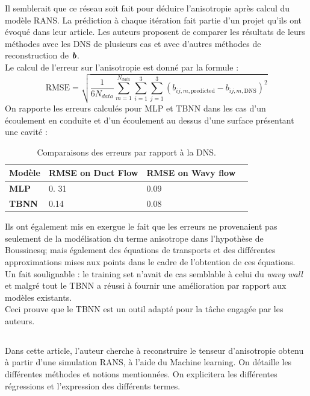 \documentclass[a4paper,12pt]{report}
\newcommand{\bepar}[1]{
	\left( #1 \right)  
}
\newcommand\bk{\color{black}}
\newcommand{\dgreen}{\color{dgreen}}
\newcommand{\dpurple}{\color{indian}}
\numberwithin{equation}{section} %
\begin{document}
\noindent Il semblerait que ce réseau soit fait pour déduire l'anisotropie après calcul du modèle RANS. La prédiction à chaque itération fait partie d'un projet qu'ils ont évoqué dans leur article. Les auteurs proposent de comparer les résultats de leurs méthodes avec les DNS de plusieurs cas et avec d'autres méthodes de reconstruction de $\textbf{\textit{b}}$.\\
Le calcul de l'erreur sur l'anisotropie est donné par la formule : 
\begin{equation*}
\text{RMSE} = \sqrt{\frac{1}{6N_{data}} \sum^{N_{data}}_{m=1} \sum^{3}_{i=1} \sum^3_{j=1} \bepar{b_{ij,m,\text{predicted}} - b_{ij,m,\text{DNS}}}^2  }
\end{equation*}
On rapporte les erreurs calculés pour MLP et TBNN dans les cas d'un écoulement en conduite et d'un écoulement au dessus d'une surface présentant une cavité : \\

 \begin{table}[!ht]
\centering
		\begin{tabular}{M{.3\textwidth} M{.3\textwidth} M{.3\textwidth} N}
		Modèle & RMSE on Duct Flow & RMSE on Wavy flow &\\[0.15cm]\hline
		\dgreen \textbf{MLP} \bk & 0. 31 & 0.09 &\\[0.2cm]		
		\dpurple \textbf{TBNN} \bk& 0.14 & 0.08 &\\[0.2cm]
		\end{tabular}
		\caption{Comparaisons des erreurs par rapport à la DNS.}
\end{table}

Ils ont également mis en exergue le fait que les erreurs ne provenaient pas seulement de la modélisation du terme anisotrope dans l'hypothèse de Boussinesq; mais également des équations de transports et des différentes approximations mises aux points dans le cadre de l'obtention de ces équations.\\

Un fait soulignable : le training set n'avait de cas semblable à celui du \textit{wavy wall} et malgré tout le TBNN a réussi à fournir une amélioration par rapport aux modèles existants.\\
Ceci prouve que le TBNN est un outil adapté pour la tâche engagée par les auteurs.
\pagebreak

\subsection*{\cite{wu2018data}}
Dans cette article, l'auteur cherche à reconstruire le tenseur d'anisotropie obtenu à partir d'une simulation RANS, à l'aide du Machine learning. On détaille les différentes méthodes et notions mentionnées. On explicitera les différentes régressions et l'expression des différents termes.\\
\end{document}
